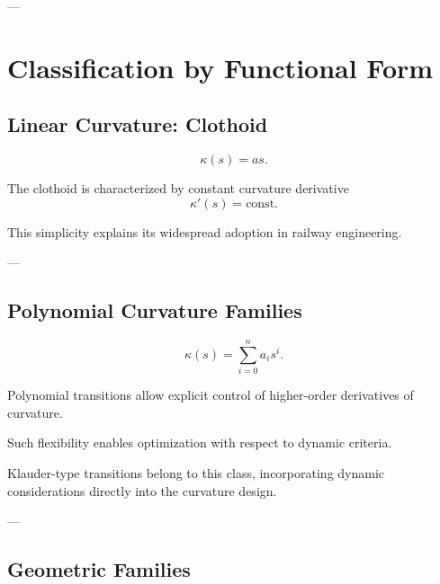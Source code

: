 ---

\section{Classification by Functional Form}

\subsection{Linear Curvature: Clothoid}

\begin{definition}
\[
\kappa(s) = a s.
\]
\end{definition}

\begin{remark}
The clothoid is characterized by constant curvature derivative
\[
\kappa'(s) = \text{const}.
\]
\end{remark}

\begin{remark}
This simplicity explains its widespread adoption in railway engineering.
\end{remark}

---

\subsection{Polynomial Curvature Families}

\begin{definition}
\[
\kappa(s) = \sum_{i=0}^{n} a_i s^i.
\]
\end{definition}

\begin{remark}
Polynomial transitions allow explicit control of higher-order
derivatives of curvature.
\end{remark}

\begin{remark}
Such flexibility enables optimization with respect to dynamic criteria.
\end{remark}

\begin{remark}
Klauder-type transitions belong to this class, incorporating dynamic
considerations directly into the curvature design.
\end{remark}

---

\subsection{Geometric Families}


